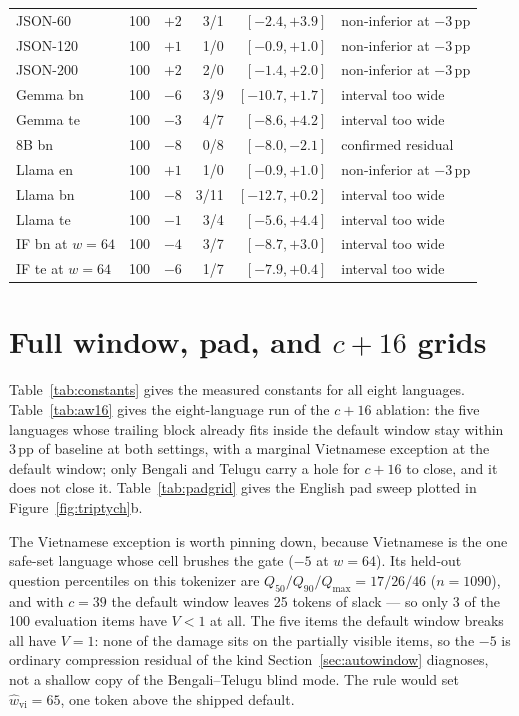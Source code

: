\documentclass{article}
\begin{document}
\begin{table}[h]
\begin{tabular}{lrrrrl}
\addlinespace
JSON-60 & 100 & ${+}2$ & 3/1 & $[-2.4, +3.9]$ & non-inferior at $-3$\,pp \\
JSON-120 & 100 & ${+}1$ & 1/0 & $[-0.9, +1.0]$ & non-inferior at $-3$\,pp \\
JSON-200 & 100 & ${+}2$ & 2/0 & $[-1.4, +2.0]$ & non-inferior at $-3$\,pp \\
\addlinespace
Gemma bn & 100 & ${-}6$ & 3/9 & $[-10.7, +1.7]$ & interval too wide \\
Gemma te & 100 & ${-}3$ & 4/7 & $[-8.6, +4.2]$ & interval too wide \\
8B bn & 100 & ${-}8$ & 0/8 & $[-8.0, -2.1]$ & confirmed residual \\
\addlinespace
Llama en & 100 & ${+}1$ & 1/0 & $[-0.9, +1.0]$ & non-inferior at $-3$\,pp \\
Llama bn & 100 & ${-}8$ & 3/11 & $[-12.7, +0.2]$ & interval too wide \\
Llama te & 100 & ${-}1$ & 3/4 & $[-5.6, +4.4]$ & interval too wide \\
\addlinespace
IF bn at $w{=}64$ & 100 & ${-}4$ & 3/7 & $[-8.7, +3.0]$ & interval too wide \\
IF te at $w{=}64$ & 100 & ${-}6$ & 1/7 & $[-7.9, +0.4]$ & interval too wide \\
\bottomrule
\end{tabular}
\end{table}

\section{Full window, pad, and \texorpdfstring{$c{+}16$}{c+16} grids}
\label{app:grids}

Table~\ref{tab:constants} gives the measured constants for all eight
languages. Table~\ref{tab:aw16} gives the eight-language run of the
$c{+}16$ ablation: the five languages whose trailing block already fits
inside the default window stay within 3\,pp of baseline at both settings,
with a marginal Vietnamese exception at the default window; only Bengali
and Telugu carry a hole for $c{+}16$ to close, and it does not close it.
Table~\ref{tab:padgrid} gives the English pad sweep plotted in
Figure~\ref{fig:triptych}b.

The Vietnamese exception is worth pinning down, because Vietnamese is
the one safe-set language whose cell brushes the gate ($-5$ at
$w{=}64$). Its held-out question percentiles on this tokenizer are
$Q_{50}/Q_{90}/Q_{\max} = 17/26/46$ ($n{=}1090$), and with $c{=}39$ the
default window leaves 25 tokens of slack --- so only 3 of the 100
evaluation items have $V<1$ at all. The five items the default window
breaks all have $V{=}1$: none of the damage sits on the partially
visible items, so the $-5$ is ordinary compression residual of the kind
Section~\ref{sec:autowindow} diagnoses, not a shallow copy of the
Bengali--Telugu blind mode. The rule would set
$\hat w_{\mathrm{vi}} = 65$, one token above the shipped default.
\end{document}

